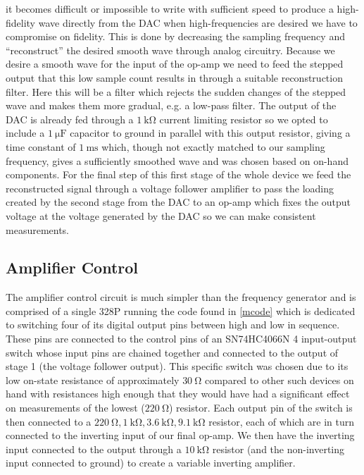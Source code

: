 \documentclass[10pt]{article}
\theoremstyle{definition}
\begin{document}
it becomes difficult or impossible to write with sufficient speed to produce a high-fidelity wave directly from the DAC
when high-frequencies are desired we have to compromise on fidelity. This is done by decreasing the sampling frequency and ``reconstruct''
the desired smooth wave through analog circuitry. Because
we desire a smooth wave for the input of the op-amp we need to feed the stepped output that this
low sample count results in through a suitable reconstruction filter. Here this will be a filter which rejects
the sudden changes of the stepped wave and makes them more gradual, e.g. a low-pass filter. The output
of the DAC is already fed through a $\qty{1}{\kilo\ohm}$ current limiting resistor so we opted to include
a $\qty{1}{\micro\farad}$ capacitor to ground in parallel with this output resistor, giving a time constant of
$\qty{1}{\milli\second}$ which, though not exactly matched to our sampling frequency, gives a sufficiently smoothed wave
and was chosen based on on-hand components. For the final step of this first stage of the whole device we feed the reconstructed signal
through a voltage follower amplifier to pass the loading created by the second stage
from the DAC to an op-amp which fixes the output voltage at the voltage generated by the DAC so we can make consistent measurements.
\subsection{Amplifier Control}
The amplifier control circuit is much simpler than the frequency generator and is comprised
of a single 328P running the code found in \ref{mcode} which is dedicated to switching four of its digital output pins between high and
low in sequence. These pins are connected to the control pins of an SN74HC4066N \cite{TI:sn74hc4066} 4 input-output switch whose input pins are chained
together and connected to the output of stage 1 (the voltage follower output). This specific switch was chosen due to 
its low on-state resistance of approximately $\qty{30}{\ohm}$ compared to other such devices on hand with resistances high enough
that they would have had a significant effect on measurements of the lowest ($\qty{220}{\ohm}$) resistor. Each output pin of the switch
is then connected to a $\qty{220}{\ohm},\qty{1}{\kilo\ohm}, \qty{3.6}{\kilo\ohm}, \qty{9.1}{\kilo\ohm}$ resistor, each of which are
in turn connected to the inverting input of our final op-amp. We then have the inverting input connected to the output
through a $\qty{10}{\kilo\ohm}$ resistor (and the non-inverting input connected to ground) to create a variable
inverting amplifier.
\end{document}
